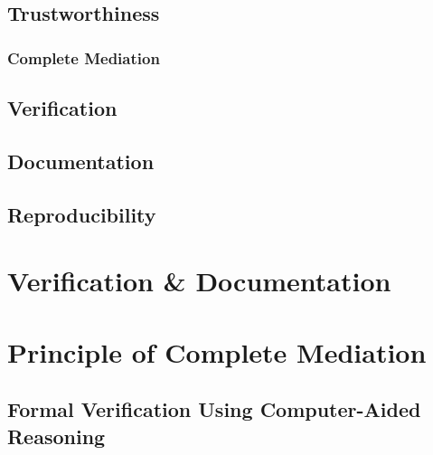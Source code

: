 \documentclass[../../main/main.tex]{subfiles}
\begin{document}
\subsection{Trustworthiness}\label{ssec:trustworthiness}
\subsubsection{Complete Mediation}\label{sssec:completemediation}

\subsection{Verification}\label{ssec:verification}
\subsection{Documentation}\label{ssec:documentation}
\subsection{Reproducibility}\label{ssec:reproducibility}

\section{Verification \& Documentation}

\section{Principle of Complete Mediation}

\subsection{Formal Verification Using Computer-Aided Reasoning}
\end{document}
